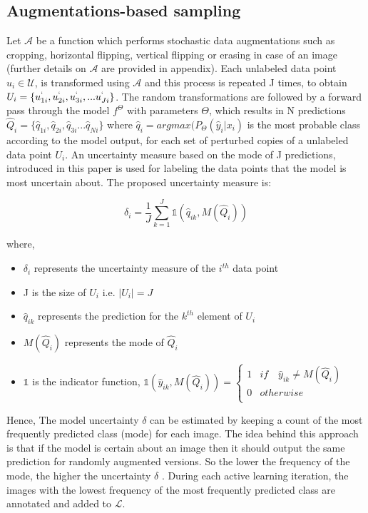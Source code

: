 \subsection{Augmentations-based sampling}
Let $\mathcal{A}$ be a function which performs stochastic data augmentations such as cropping, horizontal flipping, vertical flipping or erasing in case of an image (further details on $\mathcal{A}$ are provided in appendix). Each unlabeled data point $u_i\in\mathcal{U}$, is transformed using $\mathcal{A}$ and this process is repeated J times, to obtain $U_i = \{u_{1i}^{`}, u_{2i}^{`}, u^{`}_{3i}, ... u_{Ji}^{`}\}$. The random transformations are followed by a forward pass through the model $f^\Theta$ with parameters $\Theta$, which results in N predictions $\hat{Q}_i = \{\hat{q}_{1i}, \hat{q}_{2i}, \hat{q}_{3i} ... \hat{q}_{Ni}\}$ where $\hat{q}_i = argmax(P_\Theta(\hat{y}_i|x_i)$ is the most probable class according to the model output, for each set of perturbed copies of a unlabeled data point $U_i$. An uncertainty measure based on the mode of J predictions, introduced in this paper\cite{sadafi2019} is used for labeling the data points that the model is most uncertain about. The proposed uncertainty measure is:

\begin{equation}
    \label{equation:augmentation_based_sampling}
    \delta_{i} = \frac{1}{J} \sum_{k=1}^{J} \mathbb{1}(\hat{q}_{ik}, M(\hat{Q}_i))
\end{equation}

where,
\begin{itemize}[label={}]
  \setlength\itemsep{0em}
  \item $\delta_{i}$ represents the uncertainty measure of the $i^{th}$ data point
  \item J is the size of $U_i$ i.e. $|U_i| = J$
  \item $\hat{q}_{ik}$ represents the prediction for the $k^{th}$ element of $U_i$
  \item $M(\hat{Q}_i)$ represents the mode of $\hat{Q}_i$
  \item $\mathbb{1}$ is the indicator function, $\mathbb{1}(\hat{y}_{ik}, M(\hat{Q}_i)) = \begin{cases} 
      1 & if \quad \hat{y}_{ik} \neq M(\hat{Q}_i) \\
      0 & otherwise \\
   \end{cases}$
\end{itemize}

Hence, The model uncertainty $\delta$ can be estimated by keeping a count of the most frequently predicted class (mode) for each image. The idea behind this approach is that if the model is certain about an image then it should output the same prediction for randomly augmented versions. So the lower the frequency of the mode, the higher the uncertainty $\delta$ \cite{sadafi2019}. During each active learning iteration, the images with  the lowest frequency of the most frequently predicted class are annotated and added to $\mathcal{L}$.

